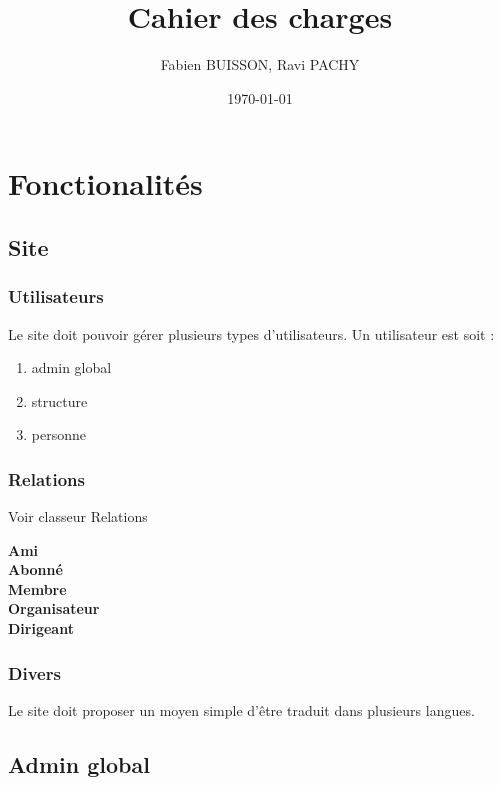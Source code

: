 \documentclass[11pt]{article}
\title{\textbf{Cahier des charges}}
\author{Fabien BUISSON, Ravi PACHY}
\date{\today}
\begin{document}
\maketitle

\section{Fonctionalités}

\subsection{Site}
\label{sub:site}

\subsubsection{Utilisateurs}

Le site doit pouvoir gérer plusieurs types d'utilisateurs.
Un utilisateur est soit :
\begin{enumerate}
  \item admin global
  \item structure
  
  \item personne
\end{enumerate}

\subsubsection{Relations}

Voir classeur Relations

{\bf Ami}\\[0.6em]

{\bf Abonné}\\[0.6em]
{\bf Membre}\\[0.6em]
{\bf Organisateur}\\[0.6em]
{\bf Dirigeant}\\[0.6em]

\subsubsection{Divers}
Le site doit proposer un moyen simple d'être traduit dans plusieurs langues.

\subsection{Admin global}


\end{document}
